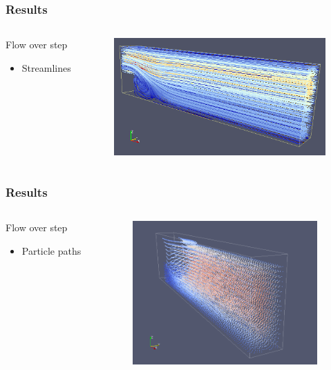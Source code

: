 \documentclass{beamer}
\begin{document}

\begin{frame}
\frametitle{Results}
\begin{columns}
\begin{column}{0.30\textwidth}
Flow over step
\begin{itemize}
\item Streamlines
\end{itemize}
\end{column}
\begin{column}{0.70\textwidth}
\includegraphics[height=4.5cm]{flowoverstep.png}
\end{column}
\end{columns}
\end{frame}

\begin{frame}
\frametitle{Results}
\begin{columns}
\begin{column}{0.33\textwidth}
Flow over step
\begin{itemize}
\item Particle paths
\end{itemize}
\end{column}
\begin{column}{0.66\textwidth}
\includegraphics[height=5.5cm]{Step-Particles.png}
\end{column}
\end{columns}
\end{frame}
\end{document}
